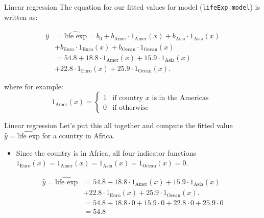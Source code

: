 \documentclass[
  ignorenonframetext,
]{beamer}
\providecommand{\tightlist}{%
  \setlength{\itemsep}{0pt}\setlength{\parskip}{0pt}}
\begin{document}
\begin{frame}[fragile]{Linear regression}
\label{linear-regression-3}
The equation for our fitted values for model (\texttt{lifeExp\_model})
is written as:

\[\begin{array}{ll}
\hat{y}&=\widehat{\text{life exp}}=b_0+b_{\text{Amer}}\cdot1_{\text{Amer}}(x)+b_{\text{Asia}}\cdot1_{\text{Asia}}(x)\\
&+b_{\text{Euro}}\cdot1_{\text{Euro}}(x)+b_{\text{Ocean}}\cdot1_{\text{Ocean}}(x)\\
&=54.8+18.8\cdot1_{\text{Amer}}(x)+15.9\cdot 1_{\text{Asia}}(x)\\
&+22.8\cdot 1_{\text{Euro}}(x)+25.9\cdot 1_{\text{Ocean}}(x).
\end{array}\]

where for example:
\[1_{\text{Amer}}(x)=\left\{\begin{array}{ll} 1 & \text{if country } x \text{ is in the Americas }\\
0 & \text{if otherwise} \end{array}\right.\]
\end{frame}

\begin{frame}{Linear regression}
\label{linear-regression-4}
Let's put this all together and compute the fitted value
\(\hat{y}=\widehat{\text{life exp}}\) for a country in Africa.

\begin{itemize}
\tightlist
\item
  Since the country is in Africa, all four indicator functions
  \(1_{\text{Euro}}(x)=1_{\text{Amer}}(x)=1_{\text{Asia}}(x)=1_{\text{Ocean}}(x)=0\).
\end{itemize}

\[\begin{array}{ll}
\hat{y}=\widehat{\text{life exp}}&=54.8+18.8\cdot1_{\text{Amer}}(x)+15.9\cdot 1_{\text{Asia}}(x)\\
&+22.8\cdot 1_{\text{Euro}}(x)+25.9\cdot 1_{\text{Ocean}}(x).\\
&=54.8+18.8\cdot0+15.9\cdot 0+22.8\cdot 0+25.9\cdot 0\\
&=54.8
\end{array}\]
\end{frame}
\end{document}

